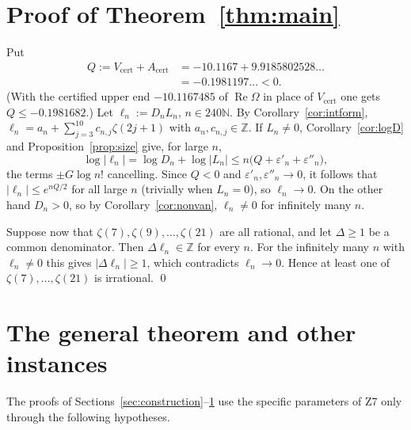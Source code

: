 \documentclass[11pt]{amsart}
\theoremstyle{definition}
\theoremstyle{remark}
\numberwithin{equation}{section}
\newcommand{\NN}{\mathbb{N}}
\newcommand{\ZZ}{\mathbb{Z}}
\newcommand{\Acert}{A_{\mathrm{cert}}}
\newcommand{\Vcert}{V_{\mathrm{cert}}}
\renewcommand{\Re}{\operatorname{Re}}
\newcommand{\eps}{\varepsilon}
\begin{document}
\section{Proof of Theorem~\ref{thm:main}}\label{sec:proof}

Put
\begin{equation}\label{eq:Q}
\begin{split}
  Q:=\Vcert+\Acert&=-10.1167+9.9185802528\ldots\\
  &=-0.1981197\ldots<0 .
\end{split}
\end{equation}
(With the certified upper end $-10.1167485$ of $\Re\Omega$ in place of $\Vcert$ one gets $Q\le-0.1981682$.) Let
$\ell_n:=D_nL_n$, $n\in240\NN$. By Corollary~\ref{cor:intform}, $\ell_n=a_n+\sum_{j=3}^{10}c_{n,j}\zeta(2j+1)$ with
$a_n,c_{n,j}\in\ZZ$. If $L_n\ne0$, Corollary~\ref{cor:logD} and Proposition~\ref{prop:size} give, for large $n$,
\[
  \log|\ell_n|=\log D_n+\log|L_n|\le n\bigl(Q+\eps'_n+\eps''_n\bigr),
\]
the terms $\pm G\log n!$ cancelling. Since $Q<0$ and $\eps'_n,\eps''_n\to0$, it follows that $|\ell_n|\le e^{nQ/2}$ for
all large $n$ (trivially when $L_n=0$), so $\ell_n\to0$. On the other hand $D_n>0$, so by Corollary~\ref{cor:nonvan},
$\ell_n\ne0$ for infinitely many $n$.

Suppose now that $\zeta(7),\zeta(9),\dots,\zeta(21)$ are all rational, and let $\Delta\ge1$ be a common denominator.
Then $\Delta\ell_n\in\ZZ$ for every $n$. For the infinitely many $n$ with $\ell_n\ne0$ this gives $|\Delta\ell_n|\ge1$,
which contradicts $\ell_n\to0$. Hence at least one of $\zeta(7),\dots,\zeta(21)$ is irrational. \qed

\section{The general theorem and other instances}\label{sec:general}

The proofs of Sections~\ref{sec:construction}--\ref{sec:proof} use the specific parameters of Z7 only through the
following hypotheses.
\end{document}
